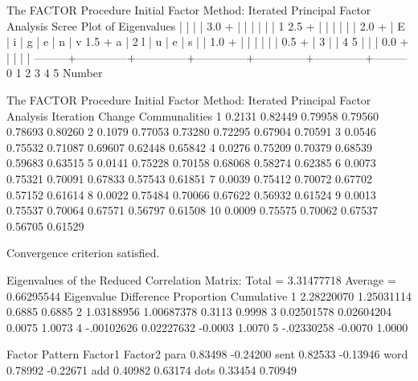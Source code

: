 \documentclass{article}
\begin{document}
\begin{Woutput}

The FACTOR Procedure
Initial Factor Method: Iterated Principal Factor Analysis
Scree Plot of Eigenvalues
      |
      |
      |
      |
  3.0 +
      |
      |
      |
      |
      |
      |                       1
  2.5 +
      |
      |
      |
      |
      |
      |
  2.0 +
      |
E     |
i     |
g     |
e     |
n     |
v 1.5 +
a     |                                      2
l     |
u     |
e     |
s     |
      |
  1.0 +
      |
      |
      |
      |
      |
      |
  0.5 +
      |                                                     3
      |
      |                                                                    4              5
      |
      |
      |
  0.0 +
      |
      |
      |
      |
      ---------+--------------+--------------+--------------+--------------+--------------+---------
               0              1              2              3              4              5
                                                  Number

The FACTOR Procedure
Initial Factor Method: Iterated Principal Factor Analysis
Iteration    Change                       Communalities
    1        0.2131    0.82449    0.79958    0.79560    0.78693    0.80260
    2        0.1079    0.77053    0.73280    0.72295    0.67904    0.70591
    3        0.0546    0.75532    0.71087    0.69607    0.62448    0.65842
    4        0.0276    0.75209    0.70379    0.68539    0.59683    0.63515
    5        0.0141    0.75228    0.70158    0.68068    0.58274    0.62385
    6        0.0073    0.75321    0.70091    0.67833    0.57543    0.61851
    7        0.0039    0.75412    0.70072    0.67702    0.57152    0.61614
    8        0.0022    0.75484    0.70066    0.67622    0.56932    0.61524
    9        0.0013    0.75537    0.70064    0.67571    0.56797    0.61508
   10        0.0009    0.75575    0.70062    0.67537    0.56705    0.61529

Convergence criterion satisfied.

Eigenvalues of the Reduced Correlation Matrix: Total = 3.31477718  Average = 0.66295544
        Eigenvalue    Difference    Proportion    Cumulative
   1    2.28220070    1.25031114        0.6885        0.6885
   2    1.03188956    1.00687378        0.3113        0.9998
   3    0.02501578    0.02604204        0.0075        1.0073
   4    -.00102626    0.02227632       -0.0003        1.0070
   5    -.02330258                     -0.0070        1.0000

           Factor Pattern
             Factor1         Factor2
para         0.83498        -0.24200
sent         0.82533        -0.13946
word         0.78992        -0.22671
add          0.40982         0.63174
dots         0.33454         0.70949


\end{Woutput}
\end{document}

